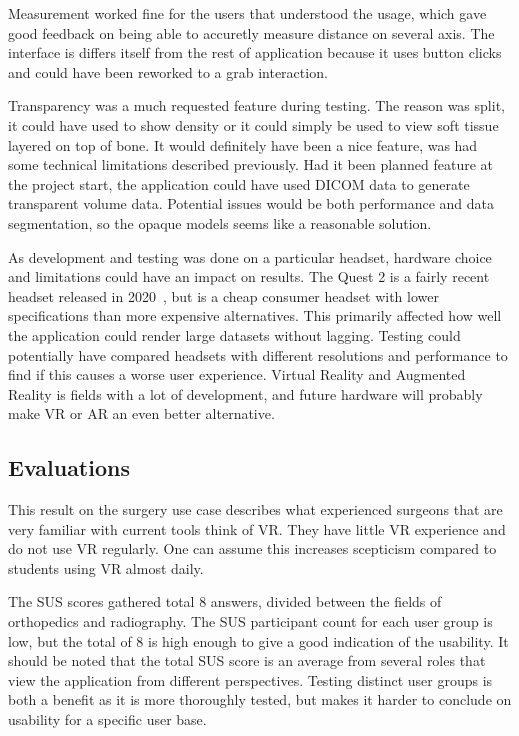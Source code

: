 \documentclass[a4paper]{report}
\begin{document}
Measurement worked fine for the users that understood the usage, which gave good feedback on being able to accuretly measure distance on several axis. The interface is differs itself from the rest of application because it uses button clicks and could have been reworked to a grab interaction.

Transparency was a much requested feature during testing. The reason was split, it could have used to show density or it could simply be used to view soft tissue layered on top of bone. It would definitely have been a nice feature, was had some technical limitations described previously. Had it been planned feature at the project start, the application could have used DICOM data to generate transparent volume data. Potential issues would be both performance and data segmentation, so the opaque models seems like a reasonable solution.


As development and testing was done on a particular headset, hardware choice and limitations could have an impact on results. The Quest 2 is a fairly recent headset released in 2020~\cite{noauthor_oculus_nodate}, but is a cheap consumer headset with lower specifications than more expensive alternatives. This primarily affected how well the application could render large datasets without lagging.
Testing could potentially have compared headsets with different resolutions and performance to find if this causes a worse user experience.
Virtual Reality and Augmented Reality is fields with a lot of development, and future hardware will probably make VR or AR an even better alternative.

\subsection{Evaluations} %
This result on the surgery use case describes what experienced surgeons that are very familiar with current tools think of VR. They have little VR experience and do not use VR regularly. One can assume this increases scepticism compared to students using VR almost daily.

The SUS scores gathered total 8 answers, divided between the fields of orthopedics and radiography.
The SUS participant count for each user group is low, but the total of 8 is high enough to give a good indication of the usability. It should be noted that the total SUS score is an average from several roles that view the application from different perspectives. Testing distinct user groups is both a benefit as it is more thoroughly tested, but makes it harder to conclude on usability for a specific user base.
\end{document}
